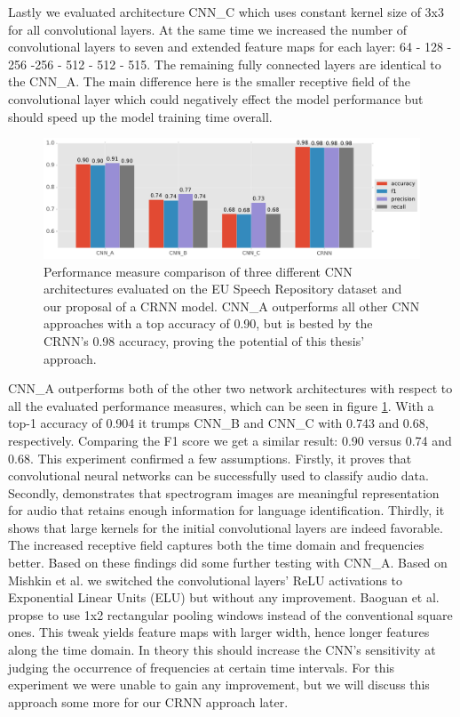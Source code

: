 Lastly we evaluated architecture CNN\_C which uses constant kernel size of 3x3 for all convolutional layers. At the same time we increased the number of convolutional layers to seven and extended feature maps for each layer: 64 - 128 - 256 -256 - 512 - 512 - 515. The remaining fully connected layers are identical to the CNN\_A. The main difference here is the smaller receptive field of the convolutional layer which could negatively effect the model performance but should speed up the model training time overall. 

	\begin{figure}[]
  		\centering
    	\includegraphics[width=\textwidth, keepaspectratio]{plots/results_eu_plot.pdf}
    	\caption{Performance measure comparison of three different CNN architectures evaluated on the EU Speech Repository dataset and our proposal of a CRNN model. CNN\_A outperforms all other CNN approaches with a top accuracy of 0.90, but is bested by the CRNN's 0.98 accuracy, proving the potential of this thesis' approach.}
    	\label{fig:eu_results}
	\end{figure}

CNN\_A outperforms both of the other two network architectures with respect to all the evaluated performance measures, which can be seen in figure \ref{fig:eu_results}. With a top-1 accuracy of 0.904 it trumps CNN\_B and CNN\_C with 0.743 and 0.68, respectively. Comparing the F1 score we get a similar result: 0.90 versus 0.74 and 0.68. This experiment confirmed a few assumptions. Firstly, it proves that convolutional neural networks can be successfully used to classify audio data. Secondly, demonstrates that spectrogram images are meaningful representation for audio that retains enough information for language identification. Thirdly, it shows that large kernels for the initial convolutional layers are indeed favorable. The increased receptive field captures both the time domain and frequencies better. 
Based on these findings did some further testing with CNN\_A. Based on Mishkin et al.\cite{mishkin2016systematic} we switched the convolutional layers' ReLU activations to Exponential Linear Units\cite{clevert2015fast} (ELU) but without any improvement. Baoguan et al. \cite{shi2016end} propse to use 1x2 rectangular pooling windows instead of the conventional square ones. This tweak yields feature maps with larger width, hence longer features along the time domain. In theory this should increase the CNN's sensitivity at judging the occurrence of frequencies at certain time intervals. For this experiment we were unable to gain any improvement, but we will discuss this approach some more for our CRNN approach later.

